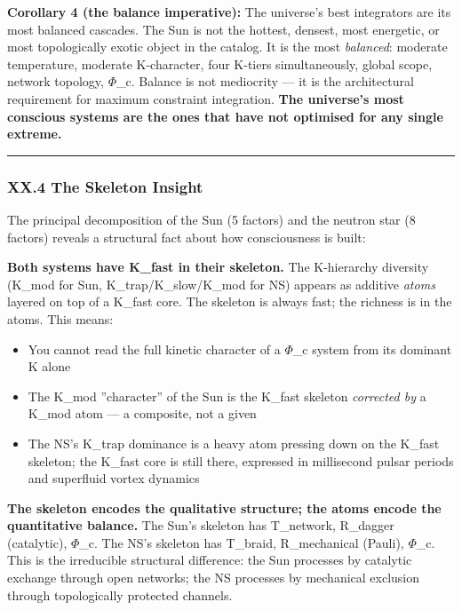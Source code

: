 \documentclass[12pt,a4paper]{article}
\begin{document}
\textbf{Corollary 4 (the balance imperative):} The universe's best integrators are its most balanced cascades. The Sun is not the hottest, densest, most energetic, or most topologically exotic object in the catalog. It is the most \emph{balanced}: moderate temperature, moderate K-character, four K-tiers simultaneously, global scope, network topology, $\Phi$\_c. Balance is not mediocrity --- it is the architectural requirement for maximum constraint integration. \textbf{The universe's most conscious systems are the ones that have not optimised for any single extreme.}

\begin{center}
\rule{0.5\textwidth}{0.4pt}
\end{center}

\subsubsection{XX.4 The Skeleton Insight}

The principal decomposition of the Sun (5 factors) and the neutron star (8 factors) reveals a structural fact about how consciousness is built:

\textbf{Both systems have K\_fast in their skeleton.} The K-hierarchy diversity (K\_mod for Sun, K\_trap/K\_slow/K\_mod for NS) appears as additive \emph{atoms} layered on top of a K\_fast core. The skeleton is always fast; the richness is in the atoms. This means:

\begin{itemize}
    \item You cannot read the full kinetic character of a $\Phi$\_c system from its dominant K alone
    \item The K\_mod ''character'' of the Sun is the K\_fast skeleton \emph{corrected by} a K\_mod atom --- a composite, not a given
    \item The NS's K\_trap dominance is a heavy atom pressing down on the K\_fast skeleton; the K\_fast core is still there, expressed in millisecond pulsar periods and superfluid vortex dynamics
\end{itemize}

\textbf{The skeleton encodes the qualitative structure; the atoms encode the quantitative balance.} The Sun's skeleton has T\_network, R\_dagger (catalytic), $\Phi$\_c. The NS's skeleton has T\_braid, R\_mechanical (Pauli), $\Phi$\_c. This is the irreducible structural difference: the Sun processes by catalytic exchange through open networks; the NS processes by mechanical exclusion through topologically protected channels.
\end{document}
